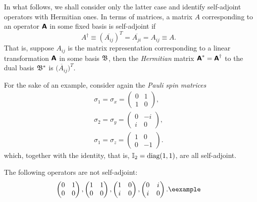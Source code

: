 In what follows, we shall consider only the latter case and identify self-adjoint operators with Hermitian ones.
In terms of matrices, a matrix $A$ corresponding to an operator $\textsf{\textbf{A}}$ in
some fixed basis is self-adjoint
if
\begin{equation}
A^{\dagger}\equiv (\overline{A_{ij}})^T=  \overline{A_{ji}} =A_{ij} \equiv A.
\end{equation}
That is, suppose $A_{ij}$ is the matrix representation
corresponding to a linear transformation $\textsf{\textbf{A}}$  in some basis ${\frak B}$,
then the {\em Hermitian} matrix $\textsf{\textbf{A}}^\ast = \textsf{\textbf{A}}^\dagger$
to the dual basis
${\frak B}^\ast $
is
$\overline{(A_{ij}})^T$.



{\color{blue}
\bexample
For the sake of an example, consider again the
{\em Pauli spin matrices}
\begin{equation}
\begin{split}
\sigma_1=\sigma_x=
\begin{pmatrix}
0&1\\
1&0
\end{pmatrix}
,   \\
\sigma_2=\sigma_y=
\begin{pmatrix}
0&-i\\
i&0
\end{pmatrix}
,   \\
\sigma_1=\sigma_z=
\begin{pmatrix}
1&0\\
0&-1
\end{pmatrix}
.
\end{split}
\end{equation}
which, together with the identity, that is, ${\Bbb I}_2=\textrm{diag}(1,1)$,  are all self-adjoint.

The following operators are not self-adjoint:
\begin{equation}
\begin{pmatrix}
0&1\\
0&0
\end{pmatrix}
 ,
\begin{pmatrix}
1&1\\
0&0
\end{pmatrix}
,
\begin{pmatrix}
1&0\\
i&0
\end{pmatrix}
,
\begin{pmatrix}
0&i\\
i&0
\end{pmatrix}
.{\textrm{\eexample}}
\end{equation}
%
}

